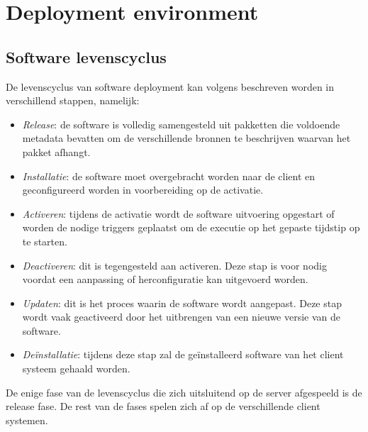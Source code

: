 \section{Deployment environment}
\subsection{Software levenscyclus}\label{sec:softwareLevenscyclus}
De levenscyclus van software deployment kan volgens \citet{softwareDeployment,hall1999cooperative} beschreven worden in verschillend stappen, namelijk:
\begin{itemize}
\item \emph{Release}: de software is volledig samengesteld uit pakketten die voldoende metadata bevatten om de verschillende bronnen te beschrijven waarvan het pakket afhangt.
\item \emph{Installatie}: de software moet overgebracht worden naar de client en geconfigureerd worden in voorbereiding op de activatie.
\item \emph{Activeren}: tijdens de activatie wordt de software uitvoering opgestart of worden de nodige triggers geplaatst om de executie op het gepaste tijdstip op te starten.
\item \emph{Deactiveren}: dit is tegengesteld aan activeren. Deze stap is voor nodig voordat een aanpassing of herconfiguratie kan uitgevoerd worden.
\item \emph{Updaten}: dit is het proces waarin de software wordt aangepast. Deze stap wordt vaak geactiveerd door het uitbrengen van een nieuwe versie van de software.
\item \emph{Deïnstallatie}: tijdens deze stap zal de geïnstalleerd software van het client systeem gehaald worden.
\end{itemize}
De enige fase van de levenscyclus die zich uitsluitend op de server afgespeeld is de release fase.
De rest van de fases spelen zich af op de verschillende client systemen.

